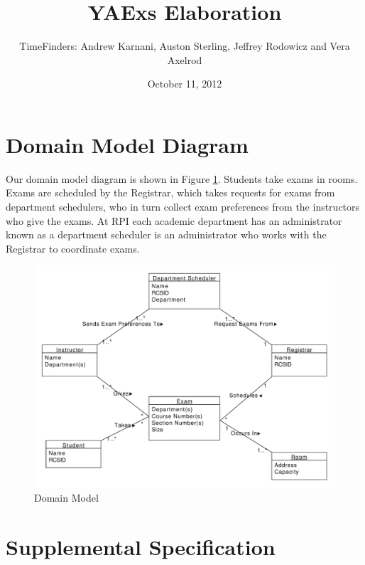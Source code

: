 \documentclass[11pt]{article}
\title{YAExs Elaboration}
\author{TimeFinders: Andrew Karnani, Auston Sterling, Jeffrey Rodowicz and Vera Axelrod}
\date{October 11, 2012}
\newcounter{id}
\begin{document}
\maketitle
\tableofcontents

\clearpage
\section{Domain Model Diagram} %
Our domain model diagram is shown in Figure \ref{fig:Domain}.  Students take exams in rooms. Exams are scheduled by the Registrar, which takes requests for exams from department schedulers, who in turn collect exam preferences from the instructors who give the exams. At RPI each academic department has an administrator known as a  department scheduler is an administrator who works with the Registrar to coordinate exams.
\begin{figure}
	\centering
		\includegraphics[width = \textwidth]{domainDiagram.pdf}
	\caption{Domain Model}
	\label{fig:Domain}
\end{figure}

\cleardoublepage

\section{Supplemental Specification} %
\end{document}
